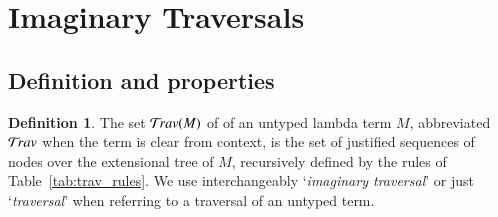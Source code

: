\documentclass{elsarticle}
\theoremstyle{plain}
\theoremstyle{definition}
\newtheorem{definition}{Definition}[section]
\newcommand{\travulc}{\travset}
\begin{document}
\section{Imaginary Traversals}
\label{sec:imaginary_traversals}
\subsection{Definition and properties}

\begin{definition}
The set $\travulc(M)$ of  of an untyped lambda term $M$, abbreviated $\travulc$ when the term is clear from context, is the set of justified sequences of nodes over the extensional tree of $M$, recursively defined by the rules of Table~\ref{tab:trav_rules}.
%
We use interchangeably `\emph{imaginary traversal}' or just `\emph{traversal}' when referring to a traversal of an untyped term.
\end{definition}
\end{document}
